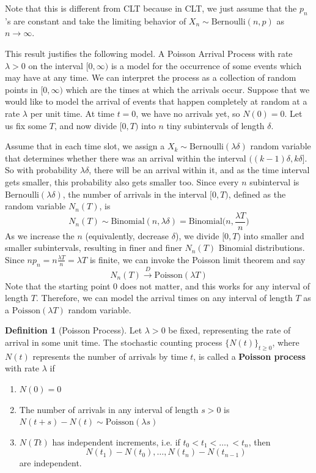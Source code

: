 \documentclass{article}
\theoremstyle{definition}
\theoremstyle{remark}
\theoremstyle{definition}
\newtheorem{definition}{Definition}[section]
\begin{document}
Note that this is different from CLT because in CLT, we just assume that the $p_n$'s are constant and take the limiting behavior of $X_n \sim \mathrm{Bernoulli}(n, p)$ as $n \rightarrow \infty$. 

This result justifies the following model. A Poisson Arrival Process with rate $\lambda > 0$ on the interval $[0, \infty)$ is a model for the occurrence of some events which may have at any time. We can interpret the process as a collection of random points in $[0, \infty)$ which are the times at which the arrivals occur. Suppose that we would like to model the arrival of events that happen completely at random at a rate $\lambda$ per unit time. At time $t = 0$, we have no arrivals yet, so $N(0) = 0$. Let us fix some $T$, and now divide $[0, T)$ into $n$ tiny subintervals of length $\delta$. 
\begin{center}
\end{center}
Assume that in each time slot, we assign a $X_k \sim \mathrm{Bernoulli}(\lambda \delta)$ random variable that determines whether there was an arrival within the interval $((k-1)\delta, k\delta]$. So with probability $\lambda\delta$, there will be an arrival within it, and as the time interval gets smaller, this probability also gets smaller too. Since every $n$ subinterval is $\mathrm{Bernoulli}(\lambda \delta)$, the number of arrivals in the interval $[0, T)$, defined as the random variable $N_n (T)$, is 
\[N_n (T) \sim \mathrm{Binomial}(n, \lambda \delta) = \mathrm{Binomial}\big(n, \frac{\lambda T}{n}\big)\]
As we increase the $n$ (equivalently, decrease $\delta$), we divide $[0, T)$ into smaller and smaller subintervals, resulting in finer and finer $N_n(T)$ Binomial distributions. Since $n p_n = n \frac{\lambda T}{n} = \lambda T$ is finite, we can invoke the Poisson limit theorem and say 
\[N_n (T) \xrightarrow{D} \mathrm{Poisson}(\lambda T)\]
Note that the starting point $0$ does not matter, and this works for any interval of length $T$. Therefore, we can model the arrival times on any interval of length $T$ as a $\mathrm{Poisson}(\lambda T)$ random variable. 

\begin{definition}[Poisson Process]
Let $\lambda > 0$ be fixed, representing the rate of arrival in some unit time. The stochastic counting process $\{N(t)\}_{t \geq 0}$, where $N(t)$ represents the number of arrivals by time $t$, is called a \textbf{Poisson process} with rate $\lambda$ if 
\begin{enumerate}
    \item $N(0) = 0$ 
    \item The number of arrivals in any interval of length $s > 0$ is $N(t + s) - N(t) \sim \mathrm{Poisson}(\lambda s)$ 
    \item $N(Tt)$ has independent increments, i.e. if $t_0 < t_1 < \ldots, < t_n$, then 
    \[N(t_1) - N(t_0), \ldots, N(t_n) - N(t_{n-1})\]
    are independent. 
\end{enumerate}
\end{definition}
\end{document}
